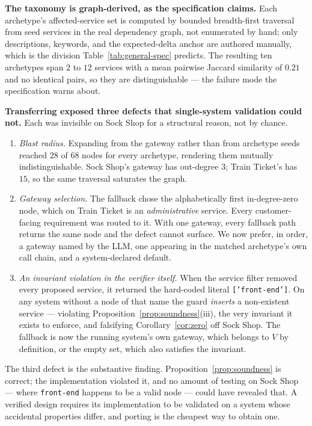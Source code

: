 \documentclass[journal, 10pt]{IEEEtran}
\begin{document}
\textbf{The taxonomy is graph-derived, as the specification claims.} Each
archetype's affected-service set is computed by bounded breadth-first traversal
from seed services in the real dependency graph, not enumerated by hand; only
descriptions, keywords, and the expected-delta anchor are authored manually, which
is the division Table~\ref{tab:general-spec} predicts. The resulting ten
archetypes span $2$ to $12$ services with a mean pairwise Jaccard similarity of
$0.21$ and no identical pairs, so they are distinguishable --- the failure mode
the specification warns about.

\textbf{Transferring exposed three defects that single-system validation could
not.} Each was invisible on Sock Shop for a structural reason, not by chance.

\begin{enumerate}
    \item \emph{Blast radius.} Expanding from the gateway rather than from
    archetype seeds reached $28$ of $68$ nodes for every archetype, rendering
    them mutually indistinguishable. Sock Shop's gateway has out-degree $3$; Train
    Ticket's has $15$, so the same traversal saturates the graph.
    \item \emph{Gateway selection.} The fallback chose the alphabetically first
    in-degree-zero node, which on Train Ticket is an \emph{administrative}
    service. Every customer-facing requirement was routed to it. With one
    gateway, every fallback path returns the same node and the defect cannot
    surface. We now prefer, in order, a gateway named by the LLM, one appearing
    in the matched archetype's own call chain, and a system-declared default.
    \item \emph{An invariant violation in the verifier itself.} When the service
    filter removed every proposed service, it returned the hard-coded literal
    \texttt{['front-end']}. On any system without a node of that name the guard
    \emph{inserts} a non-existent service --- violating
    Proposition~\ref{prop:soundness}(iii), the very invariant it exists to
    enforce, and falsifying Corollary~\ref{cor:zero} off Sock Shop. The fallback
    is now the running system's own gateway, which belongs to $V$ by definition,
    or the empty set, which also satisfies the invariant.
\end{enumerate}

The third defect is the substantive finding. Proposition~\ref{prop:soundness}
is correct; the implementation violated it, and no amount of testing on Sock Shop
--- where \texttt{front-end} happens to be a valid node --- could have revealed
that. A verified design requires its implementation to be validated on a system
whose accidental properties differ, and porting is the cheapest way to obtain
one.
\end{document}
